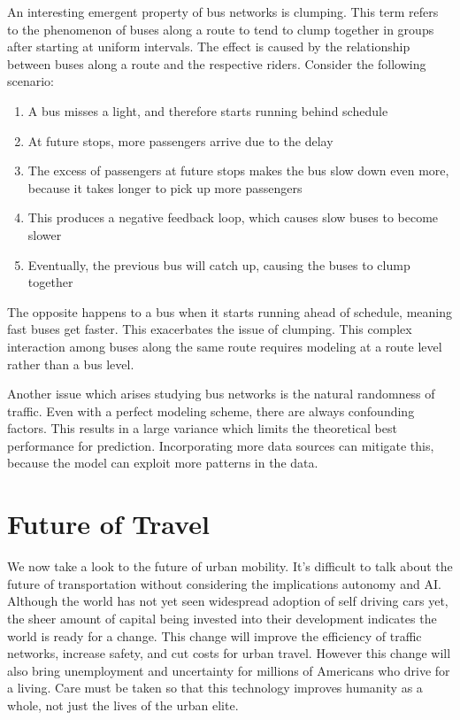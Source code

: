 
An interesting emergent property of bus networks is clumping.
This term refers to the phenomenon of buses along a route to tend to clump together in groups after starting at uniform intervals.
The effect is caused by the relationship between buses along a route and the respective riders.
Consider the following scenario:

\begin{enumerate}
\item A bus misses a light, and therefore starts running behind schedule
\item At future stops, more passengers arrive due to the delay
\item The excess of passengers at future stops makes the bus slow down even more, because it takes longer to pick up more passengers
\item This produces a negative feedback loop, which causes slow buses to become slower
\item Eventually, the previous bus will catch up, causing the buses to clump together
\end{enumerate}

The opposite happens to a bus when it starts running ahead of schedule, meaning fast buses get faster.
This exacerbates the issue of clumping.
This complex interaction among buses along the same route requires modeling at a route level rather than a bus level.


Another issue which arises studying bus networks is the natural randomness of traffic.
Even with a perfect modeling scheme, there are always confounding factors.
This results in a large variance which limits the theoretical best performance for prediction.
Incorporating more data sources can mitigate this, because the model can exploit more patterns in the data.

\section{Future of Travel}

We now take a look to the future of urban mobility.
It's difficult to talk about the future of transportation without considering the implications autonomy and AI.
Although the world has not yet seen widespread adoption of self driving cars yet, the sheer amount of capital being invested into their development indicates the world is ready for a change.
This change will improve the efficiency of traffic networks, increase safety, and cut costs for urban travel.
However this change will also bring unemployment and uncertainty for millions of Americans who drive for a living.
Care must be taken so that this technology improves humanity as a whole, not just the lives of the urban elite.


